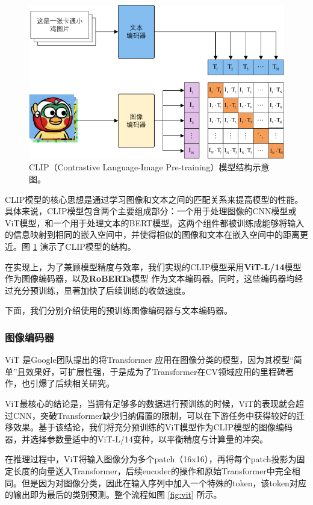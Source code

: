 \documentclass[a4paper]{zreport}
\begin{document}
\begin{figure}[h]
\centering
\includegraphics[width=0.95\linewidth]{figures/clip1}
\caption{CLIP（Contrastive Language-Image Pre-training）模型结构示意图。}
\label{fig:clip1}
\end{figure}

CLIP模型的核心思想是通过学习图像和文本之间的匹配关系来提高模型的性能。具体来说，CLIP模型包含两个主要组成部分：一个用于处理图像的CNN模型或ViT模型，和一个用于处理文本的BERT模型。这两个组件都被训练成能够将输入的信息映射到相同的嵌入空间中，并使得相似的图像和文本在嵌入空间中的距离更近。图 \ref{fig:clip1} 演示了CLIP模型的结构。

在实现上，为了兼顾模型精度与效率，我们实现的CLIP模型采用\textbf{ViT-L/14}模型作为图像编码器，以及\textbf{RoBERTa}模型
作为文本编码器。同时，这些编码器均经过充分预训练，显著加快了后续训练的收敛速度。

下面，我们分别介绍使用的预训练图像编码器与文本编码器。

\subsubsection{图像编码器}

ViT \cite{dosovitskiy2020image} 是Google团队提出的将Transformer \cite{vaswani2017attention} 应用在图像分类的模型，因为其模型“简单”且效果好，可扩展性强，于是成为了Transformer在CV领域应用的里程碑著作，也引爆了后续相关研究。

ViT最核心的结论是，当拥有足够多的数据进行预训练的时候，ViT的表现就会超过CNN，突破Transformer缺少归纳偏置的限制，可以在下游任务中获得较好的迁移效果。基于该结论，我们将充分预训练的ViT模型作为CLIP模型的图像编码器，并选择参数量适中的ViT-L/14变种，以平衡精度与计算量的冲突。

在推理过程中，ViT将输入图像分为多个patch（16x16），再将每个patch投影为固定长度的向量送入Transformer，后续encoder的操作和原始Transformer中完全相同。但是因为对图像分类，因此在输入序列中加入一个特殊的token，该token对应的输出即为最后的类别预测。整个流程如图 \ref{fig:vit} 所示。
\end{document}
